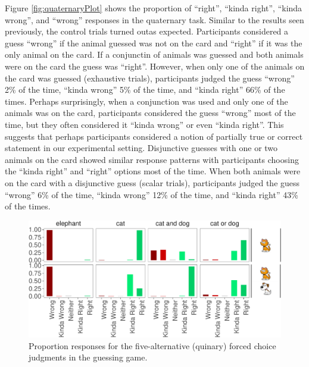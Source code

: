 \documentclass[floatsintext,man]{apa6}
\theoremstyle{definition}
\theoremstyle{definition}
\theoremstyle{definition}
\theoremstyle{remark}
\begin{document}
Figure \ref{fig:quaternaryPlot} shows the proportion of \enquote{right},
\enquote{kinda right}, \enquote{kinda wrong}, and \enquote{wrong}
responses in the quaternary task. Similar to the results seen
previously, the control trials turned outas expected. Participants
considered a guess \enquote{wrong} if the animal guessed was not on the
card and \enquote{right} if it was the only animal on the card. If a
conjunctin of animals was guessed and both animals were on the card the
guess was \enquote{right}. However, when only one of the animals on the
card was guessed (exhaustive trials), participants judged the guess
\enquote{wrong} 2\% of the time, \enquote{kinda wrong} 5\% of the time,
and \enquote{kinda right} 66\% of the times. Perhaps surprisingly, when
a conjunction was used and only one of the animals was on the card,
participants considered the guess \enquote{wrong} most of the time, but
they often considered it \enquote{kinda wrong} or even \enquote{kinda
right}. This suggests that perhaps participants considered a notion of
partially true or correct statement in our experimental setting.
Disjunctive guesses with one or two animals on the card showed similar
response patterns with participants choosing the \enquote{kinda right}
and \enquote{right} options most of the time. When both animals were on
the card with a disjunctive guess (scalar trials), participants judged
the guess \enquote{wrong} 6\% of the time, \enquote{kinda wrong} 12\% of
the time, and \enquote{kinda right} 43\% of the times.

\begin{figure}[t]

{\centering \includegraphics{writeup_files/figure-latex/quinaryPlot-1} 

}

\caption{Proportion responses for the five-alternative (quinary) forced choice judgments in the guessing game.}\label{fig:quinaryPlot}
\end{figure}
\end{document}

